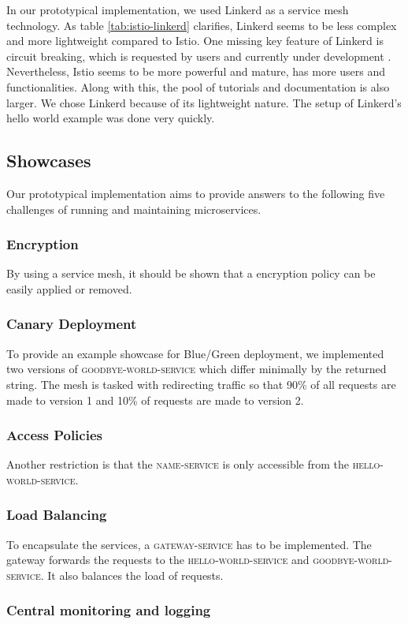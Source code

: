 In our prototypical implementation, we used Linkerd as a service mesh technology. As table \ref{tab:istio-linkerd} clarifies, Linkerd seems to be less complex and more lightweight compared to Istio. One missing key feature of Linkerd is circuit breaking, which is requested by users and currently under development \cite{linkerd-circuit-breaker}. Nevertheless, Istio seems to be more powerful and mature, has more users and functionalities. Along with this, the pool of tutorials and documentation is also larger.
We chose Linkerd because of its lightweight nature. The setup of Linkerd's hello world example was done very quickly.

\subsection{Showcases}

Our prototypical implementation aims to provide answers to the following five challenges of running and maintaining microservices.

\subsubsection{Encryption}

By using a service mesh, it should be shown that a encryption policy can be easily applied or removed.

\subsubsection{Canary Deployment}

To provide an example showcase for Blue/Green deployment, we implemented two versions of \textsc{goodbye-world-service} which differ minimally by the returned string. The mesh is tasked with redirecting traffic so that 90\% of all requests are made to version 1 and 10\% of requests are made to version 2.

\subsubsection{Access Policies}

Another restriction is that the \textsc{name-service} is only accessible from the \textsc{hello-world-service}.

\subsubsection{Load Balancing}
To encapsulate the services, a \textsc{gateway-service} has to be implemented. The gateway forwards the requests to the \textsc{hello-world-service} and \textsc{goodbye-world-service}. It also balances the load of requests.

\subsubsection{Central monitoring and logging}